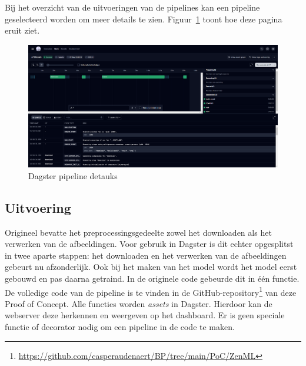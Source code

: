 Bij het overzicht van de uitvoeringen van de pipelines kan een pipeline geselecteerd worden om meer details te zien. Figuur~\ref{fig:Dagser_details} toont hoe deze pagina eruit ziet.

\begin{figure}[h]
    \centering
    \includegraphics[width=0.9\linewidth]{graphics/Dagster_Flow.PNG}
    \caption{Dagster pipeline detauks}
    \label{fig:Dagser_details}
\end{figure}
\subsection{Uitvoering}
Origineel bevatte het preprocessingsgedeelte zowel het downloaden als het verwerken van de afbeeldingen. Voor gebruik in Dagster is dit echter opgesplitst in twee aparte stappen: het downloaden en het verwerken van de afbeeldingen gebeurt nu afzonderlijk. Ook bij het maken van het model wordt het model eerst gebouwd en pas daarna getraind. In de originele code gebeurde dit in één functie.
De volledige code van de pipeline is te vinden in de GitHub-repository\footnote{\url{https://github.com/casperaudenaert/BP/tree/main/PoC/ZenML}} van deze Proof of Concept.
Alle functies worden \textit{assets} in Dagster. Hierdoor kan de webserver deze herkennen en weergeven op het dashboard. Er is geen speciale functie of decorator nodig om een pipeline in de code te maken.
